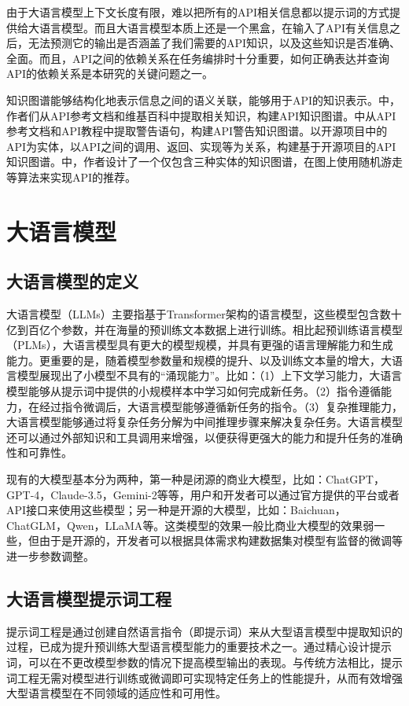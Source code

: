 由于大语言模型上下文长度有限，难以把所有的API相关信息都以提示词的方式提供给大语言模型。而且大语言模型本质上还是一个黑盒，在输入了API有关信息之后，无法预测它的输出是否涵盖了我们需要的API知识，以及这些知识是否准确、全面。而且，API之间的依赖关系在任务编排时十分重要，如何正确表达并查询API的依赖关系是本研究的关键问题之一。

知识图谱能够结构化地表示信息之间的语义关联，能够用于API的知识表示。\cite{Liu2019}中，作者们从API参考文档和维基百科中提取相关知识，构建API知识图谱。\cite{Li2018}中从API参考文档和API教程中提取警告语句，构建API警告知识图谱。\cite{Ling2019}以开源项目中的API为实体，以API之间的调用、返回、实现等为关系，构建基于开源项目的API知识图谱。\cite{Wang2021}中，作者设计了一个仅包含三种实体的知识图谱，在图上使用随机游走等算法来实现API的推荐。

\section{大语言模型}

\subsection{大语言模型的定义}
大语言模型（LLMs）主要指基于Transformer架构的语言模型，这些模型包含数十亿到百亿个参数，并在海量的预训练文本数据上进行训练。相比起预训练语言模型（PLMs），大语言模型具有更大的模型规模，并具有更强的语言理解能力和生成能力。更重要的是，随着模型参数量和规模的提升、以及训练文本量的增大，大语言模型展现出了小模型不具有的“涌现能力”。比如：（1）上下文学习能力，大语言模型能够从提示词中提供的小规模样本中学习如何完成新任务。（2）指令遵循能力，在经过指令微调后，大语言模型能够遵循新任务的指令。（3）复杂推理能力，大语言模型能够通过将复杂任务分解为中间推理步骤来解决复杂任务。大语言模型还可以通过外部知识和工具调用来增强，以便获得更强大的能力和提升任务的准确性和可靠性。

现有的大模型基本分为两种，第一种是闭源的商业大模型，比如：ChatGPT\cite{ChatGPT}，GPT-4\cite{OpenAI2023}，Claude-3.5，Gemini-2等等，用户和开发者可以通过官方提供的平台或者API接口来使用这些模型；另一种是开源的大模型，比如：Baichuan\cite{Yang2023}，ChatGLM\cite{Zeng2023}，Qwen，LLaMA\cite{Touvron2023}等。这类模型的效果一般比商业大模型的效果弱一些，但由于是开源的，开发者可以根据具体需求构建数据集对模型有监督的微调等进一步参数调整。

\subsection{大语言模型提示词工程}
提示词工程是通过创建自然语言指令（即提示词）来从大型语言模型中提取知识的过程，已成为提升预训练大型语言模型能力的重要技术之一。通过精心设计提示词，可以在不更改模型参数的情况下提高模型输出的表现。与传统方法相比，提示词工程无需对模型进行训练或微调即可实现特定任务上的性能提升，从而有效增强大型语言模型在不同领域的适应性和可用性。

